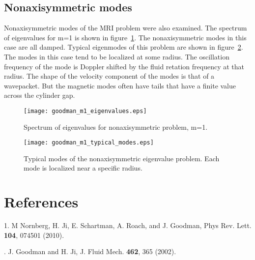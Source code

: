 \documentclass[letterpaper]{article}
\begin{document}
\subsection{Nonaxisymmetric modes}

Nonaxisymmetric modes of the MRI problem were also examined.  The
spectrum of eigenvalues for m=1 is shown in
figure~\ref{fig:goodmanm1eigenvalues}.  The nonaxisymmetric modes in
this case are all damped.  Typical eigenmodes of this problem are
shown in figure~\ref{fig:goodmanm1typicalmodes}.  The modes in this
case tend to be localized at some radius.  The oscillation frequency
of the mode is Doppler shifted by the fluid retation frequency at that
radius.  The shape of the velocity component of the modes is that of a
wavepacket.  But the magnetic modes often have tails that have a
finite value across the cylinder gap.

\begin{figure}
\begin{center}
\texttt{[image: goodman\_m1\_eigenvalues.eps]}
\caption{Spectrum of eigenvalues for nonaxisymmetric problem, m=1.}
\label{fig:goodmanm1eigenvalues}
\end{center}
\end{figure}

\begin{figure}
\begin{center}
\texttt{[image: goodman\_m1\_typical\_modes.eps]}
\caption{Typical modes of the nonaxisymmetric eigenvalue problem.
  Each mode is localized near a specific radius.}
\label{fig:goodmanm1typicalmodes}
\end{center}
\end{figure}


\section{References}
1. M Nornberg, H. Ji, E. Schartman, A. Roach, and J. Goodman, Phys
Rev. Lett. {\bf 104}, 074501 (2010).

. J. Goodman and H. Ji, J. Fluid Mech. {\bf 462}, 365 (2002).
\end{document}
